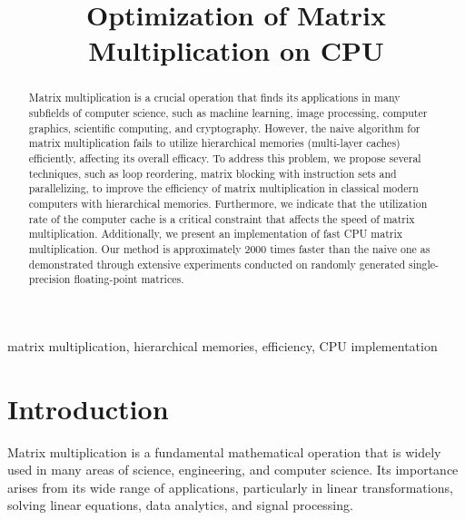 \documentclass[conference]{IEEEtran}
\begin{document}
	
	\title{Optimization of Matrix Multiplication on CPU}
	
	\author{
	}
	
	\maketitle
	
	\begin{abstract}
		Matrix multiplication is a crucial operation that finds its applications in many subfields of computer science, such as machine learning, image processing, computer graphics, scientific computing, and cryptography. However, the naive algorithm for matrix multiplication fails to utilize hierarchical memories (multi-layer caches) efficiently, affecting its overall efficacy. To address this problem, we propose several techniques, such as loop reordering, matrix blocking with instruction sets and parallelizing, to improve the efficiency of matrix multiplication in classical modern computers with hierarchical memories. Furthermore, we indicate that the utilization rate of the computer cache is a critical constraint that affects the speed of matrix multiplication. Additionally, we present an implementation of fast CPU matrix multiplication. Our method is approximately 2000 times faster than the naive one as demonstrated through extensive experiments conducted on randomly generated single-precision floating-point matrices.
	\end{abstract}
	
	\begin{IEEEkeywords}
		matrix multiplication, hierarchical memories, efficiency, CPU implementation
	\end{IEEEkeywords}
	
	\section{Introduction}
	Matrix multiplication is a fundamental mathematical operation that is widely used in many areas of science, engineering, and computer science. Its importance arises from its wide range of applications, particularly in linear transformations, solving linear equations, data analytics, and signal processing. 
	
\end{document}
